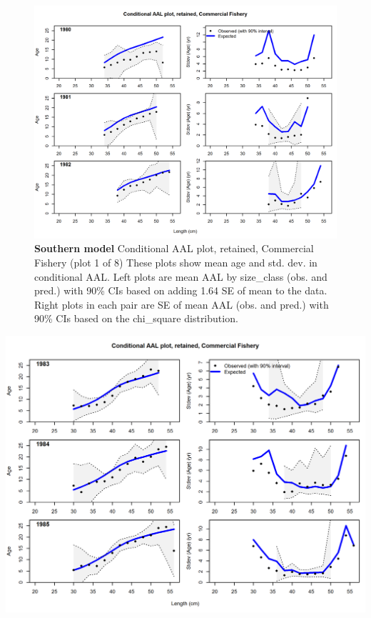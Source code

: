 \documentclass[12pt,]{article}
\begin{document}
\begin{figure}[htbp]
\centering
\includegraphics{./r4ss/plots_mod2/comp_condAALfit_Andre_plotsflt2mkt2_page1.png}
\caption{\textbf{Southern model} Conditional AAL plot, retained,
Commercial Fishery (plot 1 of 8) These plots show mean age and std. dev.
in conditional AAL. Left plots are mean AAL by size\_class (obs. and
pred.) with 90\% CIs based on adding 1.64 SE of mean to the data. Right
plots in each pair are SE of mean AAL (obs. and pred.) with 90\% CIs
based on the chi\_square distribution.
\label{fig:mod2_5_comp_condAALfit_Andre_plotsflt2mkt2_page1}}
\end{figure}

\includegraphics{./r4ss/plots_mod2/comp_condAALfit_Andre_plotsflt2mkt2_page2.png}
\end{document}
